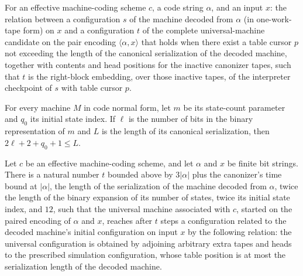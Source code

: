 \begin{definition}
\label{Turing.universalRelation}
\leanok
{}
For an effective machine-coding scheme $c$, a code string $\alpha$, and an
input $x$: the relation between a configuration $s$ of the machine decoded
from $\alpha$ (in one-work-tape form) on $x$ and a configuration $t$ of the
complete universal-machine candidate on the pair encoding
$\langle \alpha, x \rangle$ that holds when there exist a table cursor $p$
not exceeding the length of the canonical serialization of the decoded
machine, together with contents and head positions for the inactive
canonizer tapes, such that $t$ is the right-block embedding, over those
inactive tapes, of the interpreter checkpoint of $s$ with table cursor
$p$.
\end{definition}

\begin{lemma}
\label{Turing.universal_header_bound}
\leanok
{}
For every machine $M$ in code normal form, let $m$ be its state-count parameter and
$q_0$ its initial state index. If $\ell$ is the number of bits in the binary
representation of $m$ and $L$ is the length of its canonical serialization, then
$2\ell+2+q_0+1\le L$.
\end{lemma}

\begin{lemma}
\label{Turing.universalRelation_start}
\leanok
{}
Let $c$ be an effective machine-coding scheme, and let $\alpha$ and $x$ be finite bit
strings. There is a natural number $t$ bounded above by $3|\alpha|$ plus the canonizer's
time bound at $|\alpha|$, the length of the serialization of the machine decoded from
$\alpha$, twice the length of the binary expansion of its number of states, twice its
initial state index, and $12$, such that the universal machine associated with $c$,
started on the paired encoding of $\alpha$ and $x$, reaches after $t$ steps a
configuration related to the decoded machine's initial configuration on input $x$ by the
following relation: the universal configuration is obtained by adjoining arbitrary extra
tapes and heads to the prescribed simulation configuration, whose table position is at
most the serialization length of the decoded machine.
\end{lemma}

